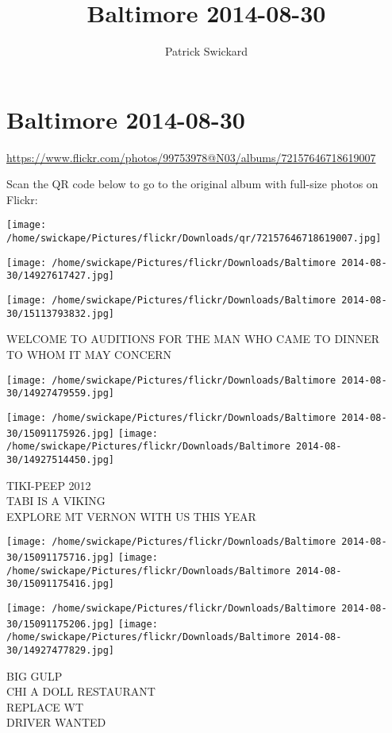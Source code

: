 \documentclass[10pt,letterpaper]{article}
\title{Baltimore 2014-08-30}
\author{Patrick Swickard}
\date{}
\begin{document}
\section*{Baltimore 2014-08-30}

\url{https://www.flickr.com/photos/99753978@N03/albums/72157646718619007}

Scan the QR code below to go to the original album with full-size photos on Flickr:

\texttt{[image: /home/swickape/Pictures/flickr/Downloads/qr/72157646718619007.jpg]}
\pagebreak

\texttt{[image: /home/swickape/Pictures/flickr/Downloads/Baltimore 2014-08-30/14927617427.jpg]}

\vspace{0.25in}
\texttt{[image: /home/swickape/Pictures/flickr/Downloads/Baltimore 2014-08-30/15113793832.jpg]}

WELCOME TO AUDITIONS FOR THE MAN WHO CAME TO DINNER\\
TO WHOM IT MAY CONCERN
\pagebreak

\texttt{[image: /home/swickape/Pictures/flickr/Downloads/Baltimore 2014-08-30/14927479559.jpg]}

\vspace{0.25in}
\texttt{[image: /home/swickape/Pictures/flickr/Downloads/Baltimore 2014-08-30/15091175926.jpg]}
\texttt{[image: /home/swickape/Pictures/flickr/Downloads/Baltimore 2014-08-30/14927514450.jpg]}

TIKI{-}PEEP 2012\\
TABI IS A VIKING\\
EXPLORE MT VERNON WITH US THIS YEAR
\pagebreak

\texttt{[image: /home/swickape/Pictures/flickr/Downloads/Baltimore 2014-08-30/15091175716.jpg]}
\texttt{[image: /home/swickape/Pictures/flickr/Downloads/Baltimore 2014-08-30/15091175416.jpg]}

\texttt{[image: /home/swickape/Pictures/flickr/Downloads/Baltimore 2014-08-30/15091175206.jpg]}
\texttt{[image: /home/swickape/Pictures/flickr/Downloads/Baltimore 2014-08-30/14927477829.jpg]}

BIG GULP\\
CHI A DOLL RESTAURANT\\
REPLACE WT\\
DRIVER WANTED
\pagebreak
\end{document}
